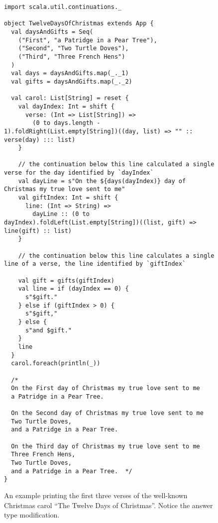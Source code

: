 \begin{figure}[h!] 
\begin{lstlisting}
import scala.util.continuations._

object TwelveDaysOfChristmas extends App {
  val daysAndGifts = Seq(
    ("First", "a Patridge in a Pear Tree"),
    ("Second", "Two Turtle Doves"),
    ("Third", "Three French Hens")
  )
  val days = daysAndGifts.map(_._1)
  val gifts = daysAndGifts.map(_._2)

  val carol: List[String] = reset {
    val dayIndex: Int = shift {
      verse: (Int => List[String]) =>
        (0 to days.length - 1).foldRight(List.empty[String])((day, list) => "" :: verse(day) ::: list)
    }

    // the continuation below this line calculated a single verse for the day identified by `dayIndex`
    val dayLine = s"On the ${days(dayIndex)} day of Christmas my true love sent to me"
    val giftIndex: Int = shift {
      line: (Int => String) =>
        dayLine :: (0 to dayIndex).foldLeft(List.empty[String])((list, gift) => line(gift) :: list)
    }

    // the continuation below this line calculates a single line of a verse, the line identified by `giftIndex`

    val gift = gifts(giftIndex)
    val line = if (dayIndex == 0) {
      s"$gift."
    } else if (giftIndex > 0) {
      s"$gift,"
    } else {
      s"and $gift."
    }
    line
  }
  carol.foreach(println(_))

  /*
  On the First day of Christmas my true love sent to me
  a Patridge in a Pear Tree.

  On the Second day of Christmas my true love sent to me
  Two Turtle Doves,
  and a Patridge in a Pear Tree.

  On the Third day of Christmas my true love sent to me
  Three French Hens,
  Two Turtle Doves,
  and a Patridge in a Pear Tree.  */
}
\end{lstlisting}
\caption{An example printing the first three verses of the well-known Christmas carol ``The Twelve Days of Christmas''. Notice the answer type modification.}
\label{fig:example_twelve_days}
\end{figure}





